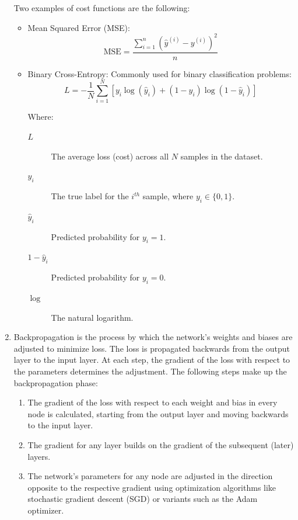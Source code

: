 \begin{enumerate}
			\bigskip
			Two examples of cost functions are the following:
			\begin{itemize}
				\item Mean Squared Error (MSE):
				\begin{equation}
					\text{MSE} = \frac{\sum_{i=1}^n (\hat{y}^{(i)} - y^{(i)})^2}{n}
				\end{equation}

				
				\item Binary Cross-Entropy:
				Commonly used for binary classification problems:
				\begin{equation}
					L = -\frac{1}{N} \sum_{i=1}^N \left[ y_i \log(\hat{y}_i) + (1 - y_i) \log(1 - \hat{y}_i) \right]
				\end{equation}

				\bigskip
				Where:
				\begin{description}
					\item[$L$] The average loss (cost) across all $N$ samples in the dataset.
					\item[$y_i$] The true label for the $i^{th}$ sample, where $y_i \in \{0, 1\}$.
					\item[$\hat{y}_i$] Predicted probability for $y_i = 1$.
					\item[$1 - \hat{y}_i$] Predicted probability for $y_i = 0$.
					\item[$\log$] The natural logarithm.
				\end{description}
				\bigskip

			\end{itemize}
			\bigskip
			
			\item Backpropagation is the process by which the network's weights and biases are adjusted to minimize loss. The loss is propagated backwards from the output layer to the input layer. At each step, the gradient of the loss with respect to the parameters determines the adjustment. The following steps make up the backpropagation phase:
			
			\bigskip
			\begin{enumerate}
				\item The gradient of the loss with respect to each weight and bias in every node is calculated, starting from the output layer and moving backwards to the input layer.
				\item The gradient for any layer builds on the gradient of the subsequent (later) layers.
				\item The network's parameters for any node are adjusted in the direction opposite to the respective gradient using optimization algorithms like stochastic gradient descent (SGD) or variants such as the Adam optimizer.
			\end{enumerate}
		\end{enumerate}


